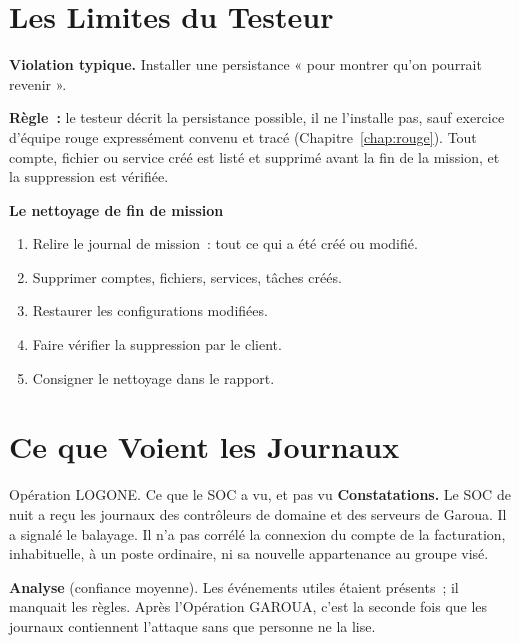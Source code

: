 \section{Les Limites du Testeur}
\label{sec:c12-limites}

\begin{boxalert}
\textbf{Violation typique.} Installer une persistance « pour montrer
qu'on pourrait revenir ».

\smallskip
\textbf{Règle~:} le testeur décrit la persistance possible, il ne l'installe
pas, sauf exercice d'équipe rouge expressément convenu et tracé
(Chapitre~\ref{chap:rouge}). Tout compte, fichier ou service créé est listé
et supprimé avant la fin de la mission, et la suppression est vérifiée.
\end{boxalert}

\begin{boxprocedure}
\textbf{Le nettoyage de fin de mission}
\begin{enumerate}
    \item Relire le journal de mission~: tout ce qui a été créé ou modifié.
    \item Supprimer comptes, fichiers, services, tâches créés.
    \item Restaurer les configurations modifiées.
    \item Faire vérifier la suppression par le client.
    \item Consigner le nettoyage dans le rapport.
\end{enumerate}
\end{boxprocedure}

\section{Ce que Voient les Journaux}
\label{sec:c12-journaux}

\begin{boxscenario}{Opération LOGONE. Ce que le SOC a vu, et pas vu}
\textbf{Constatations.} Le SOC de nuit a reçu les journaux des contrôleurs
de domaine et des serveurs de Garoua. Il a signalé le balayage. Il n'a pas
corrélé la connexion du compte de la facturation, inhabituelle, à un poste
ordinaire, ni sa nouvelle appartenance au groupe visé.

\medskip
\textbf{Analyse} (confiance moyenne). Les événements utiles étaient
présents~; il manquait les règles. Après l'Opération GAROUA, c'est la
seconde fois que les journaux contiennent l'attaque sans que personne ne la
lise.
\end{boxscenario}

